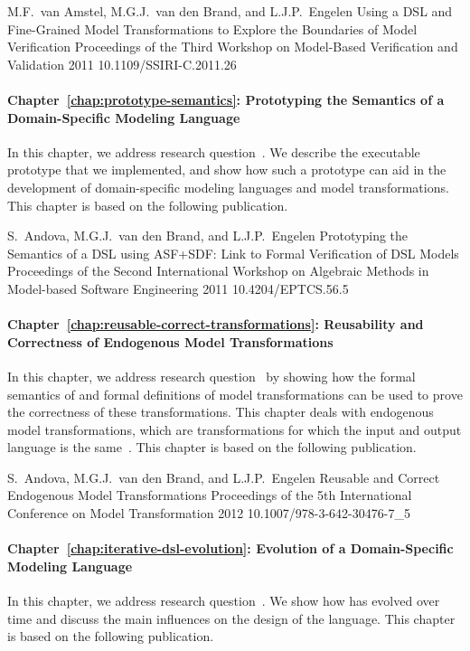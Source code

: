{M.F.\ van Amstel, M.G.J.\ van den Brand, and L.J.P.\ Engelen}
{Using a DSL and Fine-Grained Model Transformations to Explore the Boundaries of Model Verification}
{Proceedings of the Third Workshop on Model-Based Verification and Validation}
{2011}
{10.1109/SSIRI-C.2011.26}

\paragraph{Chapter~\ref{chap:prototype-semantics}: Prototyping the Semantics of a Domain-Specific Modeling Language}
In this chapter, we address research question~.
We describe the executable prototype that we implemented, and show how such a prototype can aid in the development of domain-specific modeling languages and model transformations.
This chapter is based on the following publication.

{S.\ Andova, M.G.J.\ van den Brand, and L.J.P.\ Engelen}
{Prototyping the Semantics of a DSL using ASF+SDF: Link to Formal Verification of DSL Models}
{Proceedings of the Second International Workshop on Algebraic Methods in Model-based Software Engineering}
{2011}
{10.4204/EPTCS.56.5}

\paragraph{Chapter~\ref{chap:reusable-correct-transformations}: Reusability and Correctness of Endogenous Model Transformations}
In this chapter, we address research question~ by showing how the formal semantics of \SLCO and formal definitions of model transformations can be used to prove the correctness of these transformations.
This chapter deals with endogenous model transformations, which are transformations for which the input and output language is the same~\cite{Mens:2006:TMT:1706639.1706924}.
This chapter is based on the following publication.

{S.\ Andova, M.G.J.\ van den Brand, and L.J.P.\ Engelen}
{Reusable and Correct Endogenous Model Transformations}
{Proceedings of the 5th International Conference on Model Transformation}
{2012}
{10.1007/978-3-642-30476-7\_5}

\paragraph{Chapter~\ref{chap:iterative-dsl-evolution}: Evolution of a Domain-Specific Modeling Language}
In this chapter, we address research question~.
We show how \SLCO has evolved over time and discuss the main influences on the design of the language.
This chapter is based on the following publication.

